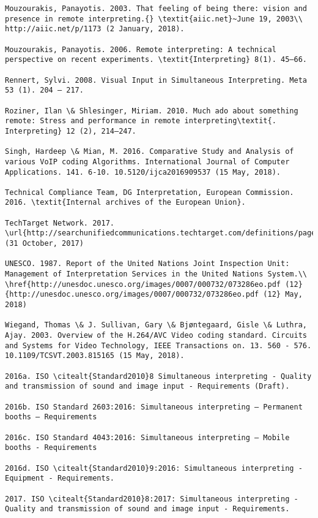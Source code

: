 \documentclass[output=paper]{langsci/langscibook}
\begin{document}
\begin{verbatim}
Mouzourakis, Panayotis. 2003. That feeling of being there: vision and presence in remote interpreting.{} \textit{aiic.net}~June 19, 2003\\
http://aiic.net/p/1173 (2 January, 2018). 

Mouzourakis, Panayotis. 2006. Remote interpreting: A technical perspective on recent experiments. \textit{Interpreting} 8(1). 45–66.

Rennert, Sylvi. 2008. Visual Input in Simultaneous Interpreting. Meta 53 (1). 204 – 217.

Roziner, Ilan \& Shlesinger, Miriam. 2010. Much ado about something remote: Stress and performance in remote interpreting\textit{. Interpreting} 12 (2), 214–247.

Singh, Hardeep \& Mian, M. 2016. Comparative Study and Analysis of various VoIP coding Algorithms. International Journal of Computer Applications. 141. 6-10. 10.5120/ijca2016909537 (15 May, 2018).

Technical Compliance Team, DG Interpretation, European Commission. 2016. \textit{Internal archives of the European Union}.

TechTarget Network. 2017. \url{http://searchunifiedcommunications.techtarget.com/definitions/page/7} (31 October, 2017)

UNESCO. 1987. Report of the United Nations Joint Inspection Unit: Management of Interpretation Services in the United Nations System.\\
\href{http://unesdoc.unesco.org/images/0007/000732/073286eo.pdf (12}{http://unesdoc.unesco.org/images/0007/000732/073286eo.pdf (12} May, 2018)

Wiegand, Thomas \& J. Sullivan, Gary \& Bjøntegaard, Gisle \& Luthra, Ajay. 2003. Overview of the H.264/AVC Video coding standard. Circuits and Systems for Video Technology, IEEE Transactions on. 13. 560 - 576. 10.1109/TCSVT.2003.815165 (15 May, 2018).

2016a. ISO \citealt{Standard2010}8 Simultaneous interpreting - Quality and transmission of sound and image input - Requirements (Draft).

2016b. ISO Standard 2603:2016: Simultaneous interpreting – Permanent booths – Requirements

2016c. ISO Standard 4043:2016: Simultaneous interpreting – Mobile booths - Requirements

2016d. ISO \citealt{Standard2010}9:2016: Simultaneous interpreting - Equipment - Requirements.

2017. ISO \citealt{Standard2010}8:2017: Simultaneous interpreting - Quality and transmission of sound and image input - Requirements.


\end{verbatim}  
\sloppy
\printbibliography[heading=subbibliography,notkeyword=this] 
\end{document}
